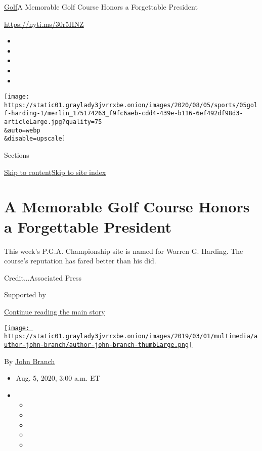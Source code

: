 \href{/section/sports/golf}{Golf}\textbar{}A Memorable Golf Course
Honors a Forgettable President

\url{https://nyti.ms/30r5HNZ}

\begin{itemize}
\item
\item
\item
\item
\item
\end{itemize}

\texttt{[image: https://static01.graylady3jvrrxbe.onion/images/2020/08/05/sports/05golf-harding-1/merlin\_175174263\_f9fc6aeb-cdd4-439e-b116-6ef492df98d3-articleLarge.jpg?quality=75\\\&auto=webp\\\&disable=upscale]}

Sections

\protect\hyperlink{site-content}{Skip to
content}\protect\hyperlink{site-index}{Skip to site index}

\hypertarget{a-memorable-golf-course-honors-a-forgettable-president}{%
\section{A Memorable Golf Course Honors a Forgettable
President}\label{a-memorable-golf-course-honors-a-forgettable-president}}

This week's P.G.A. Championship site is named for Warren G. Harding. The
course's reputation has fared better than his did.

Credit...Associated Press

Supported by

\protect\hyperlink{after-sponsor}{Continue reading the main story}

\href{https://www.nytimes3xbfgragh.onion/by/john-branch}{\texttt{[image: https://static01.graylady3jvrrxbe.onion/images/2019/03/01/multimedia/author-john-branch/author-john-branch-thumbLarge.png]}}

By \href{https://www.nytimes3xbfgragh.onion/by/john-branch}{John Branch}

\begin{itemize}
\item
  Aug. 5, 2020, 3:00 a.m. ET
\item
  \begin{itemize}
  \item
  \item
  \item
  \item
  \item
  \end{itemize}
\end{itemize}

